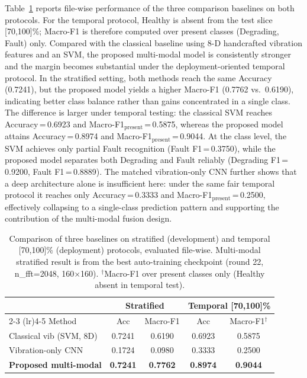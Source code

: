 \documentclass[pdflatex,sn-mathphys-num]{sn-jnl}%
\begin{document}
Table~\ref{tab:baseline_comparison} reports file-wise performance of the three comparison baselines on both protocols.
For the temporal protocol, Healthy is absent from the test slice [70,100]\%; Macro-F1 is therefore computed over present classes (Degrading, Fault) only.
Compared with the classical baseline using 8-D handcrafted vibration features and an SVM, the proposed multi-modal model is consistently stronger and the margin becomes substantial under the deployment-oriented temporal protocol. In the stratified setting, both methods reach the same Accuracy (0.7241), but the proposed model yields a higher Macro-F1 (0.7762 vs.\ 0.6190), indicating better class balance rather than gains concentrated in a single class.
The difference is larger under temporal testing: the classical SVM reaches Accuracy\,=\,0.6923 and Macro-F1$_{\text{present}}$\,=\,0.5875, whereas the proposed model attains Accuracy\,=\,0.8974 and Macro-F1$_{\text{present}}$\,=\,0.9044. At the class level, the SVM achieves only partial Fault recognition (Fault F1\,=\,0.3750), while the proposed model separates both Degrading and Fault reliably (Degrading F1\,=\,0.9200, Fault F1\,=\,0.8889). The matched vibration-only CNN further shows that a deep architecture alone is insufficient here: under the same fair temporal protocol it reaches only Accuracy\,=\,0.3333 and Macro-F1$_{\text{present}}$\,=\,0.2500, effectively collapsing to a single-class prediction pattern and supporting the contribution of the multi-modal fusion design.

\begin{table}[htbp]
  \caption{Comparison of three baselines on stratified (development) and temporal [70,100]\% (deployment) protocols, evaluated file-wise.
  Multi-modal stratified result is from the best auto-training checkpoint (round 22, n\_fft=2048, 160$\times$160).
  $^\dagger$Macro-F1 over present classes only (Healthy absent in temporal test).}
  \label{tab:baseline_comparison}
  \centering
  \begin{tabular}{l cc cc}
    \toprule
    & \multicolumn{2}{c}{Stratified} & \multicolumn{2}{c}{Temporal [70,100]\%} \\
    \cmidrule(lr){2-3} \cmidrule(lr){4-5}
    Method & Acc & Macro-F1 & Acc & Macro-F1$^\dagger$ \\
    \midrule
    Classical vib (SVM, 8D)    & 0.7241 & 0.6190 & 0.6923 & 0.5875 \\
    Vibration-only CNN          & 0.1724 & 0.0980 & 0.3333 & 0.2500 \\
    \textbf{Proposed multi-modal} & \textbf{0.7241} & \textbf{0.7762} & \textbf{0.8974} & \textbf{0.9044} \\
    \bottomrule
  \end{tabular}
\end{table}
\end{document}
